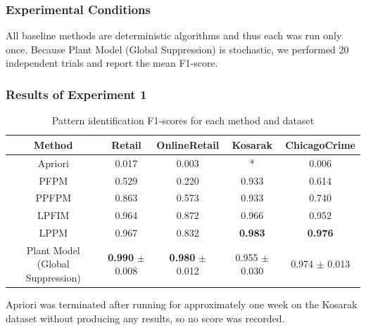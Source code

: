 \subsubsection{Experimental Conditions}
All baseline methods are deterministic algorithms and thus each was run only once. Because Plant Model (Global Suppression) is stochastic, we performed 20 independent trials and report the mean F1‐score. 

\subsubsection{Results of Experiment 1}
\begin{table}[t]
  \centering
  \begin{threeparttable}
    \caption{Pattern identification F1‐scores for each method and dataset}
    \label{tab:f1_scores}
    \begin{tabular}{|c|cccc|}
      \hline
      Method & Retail & OnlineRetail & Kosarak & ChicagoCrime \\
      \hline
      Apriori                   & 0.017 & 0.003 & * & 0.006 \\
      PFPM                      & 0.529 & 0.220 & 0.933      & 0.614 \\
      PPFPM                     & 0.863 & 0.573 & 0.933      & 0.740 \\
      LPFIM                     & 0.964 & 0.872 & 0.966      & 0.952 \\
      LPPM                      & 0.967 & 0.832 & \textbf{0.983} & \textbf{0.976} \\
      Plant Model (Global Suppression)          & \textbf{0.990} $\pm$ 0.008 & \textbf{0.980} $\pm$ 0.012& 0.955 $\pm$ 0.030 & 0.974 $\pm$ 0.013\\
      \hline
    \end{tabular}
    \begin{tablenotes}
      \footnotesize
      \item[*] Apriori was terminated after running for approximately one week on the Kosarak dataset without producing any results, so no score was recorded.
    \end{tablenotes}
  \end{threeparttable}
\end{table}

